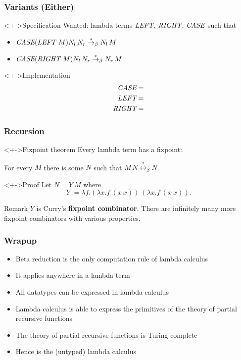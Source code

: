 \documentclass[pdftex,aspectratio=169]{beamer}
\begin{document}
\begin{frame}
  \frametitle{Variants (Either)}
  \begin{exampleblock}<+->{Specification}
    Wanted: lambda terms $\textit{LEFT}$, $\textit{RIGHT}$, $\textit{CASE}$ such that
    \begin{itemize}
    \item $\textit{CASE} (\textit{LEFT}~M) N_l\,N_r \stackrel\ast\rightarrow_\beta N_l\,M$
    \item $\textit{CASE} (\textit{RIGHT}~M) N_l\,N_r \stackrel\ast\rightarrow_\beta N_r\,M$
    \end{itemize}
  \end{exampleblock}
  \begin{alertblock}<+->{Implementation}\VSPBLS
    \begin{align*}
      \textit{CASE} &= \\
      \textit{LEFT} &= \\
      \textit{RIGHT}&=
    \end{align*}
  \end{alertblock}
\end{frame}
\begin{frame}
  \frametitle{Recursion}
  \begin{alertblock}<+->{Fixpoint theorem}
    Every lambda term has a fixpoint:

    For every $M$ there is some $N$ such that
    $
    M\, N \overset{\ast}{\leftrightarrow}_\beta N
    $.
  \end{alertblock}
  \begin{exampleblock}<+->{Proof}
    Let $N = Y~M$ where
    \begin{displaymath}
      Y := \lambda f.(\lambda x.f~(x~x))~(\lambda x.f~(x~x)).
    \end{displaymath}
  \end{exampleblock}
  \begin{block}{Remark}
    $Y$ is Curry's \textbf{fixpoint combinator}. There are infinitely
    many more fixpoint combinators with various properties.
  \end{block}
\end{frame}
\begin{frame}
  \frametitle{Wrapup}
  \begin{itemize}
  \item Beta reduction is the only computation rule of lambda calculus
  \item It applies anywhere in a lambda term
  \item All datatypes can be expressed in lambda calculus
  \item Lambda calculus is able to express the primitives of the
    theory of partial recursive functions
  \item The theory of partial recursive functions is Turing complete
  \item Hence is the (untyped) lambda calculus
  \end{itemize}
\end{frame}
\end{document}
